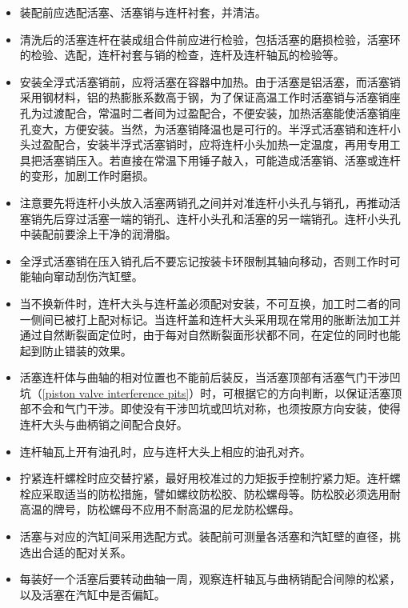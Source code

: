 \documentclass[UTF8]{ctexart}
\numberwithin{figure}{section}
\numberwithin{table}{section}
\begin{document}
\begin{itemize}
	\item 装配前应选配活塞、活塞销与连杆衬套，并清洁。

	\item 清洗后的活塞连杆在装成组合件前应进行检验，包括活塞的磨损检验，活塞环的检验、选配，连杆衬套与销的检查，连杆及连杆轴瓦的检验等。

	\item 安装全浮式活塞销前，应将活塞在容器中加热。由于活塞是铝活塞，而活塞销采用钢材料，铝的热膨胀系数高于钢，为了保证高温工作时活塞销与活塞销座孔为过渡配合，常温时二者间为过盈配合，不便安装，加热活塞能使活塞销座孔变大，方便安装。当然，为活塞销降温也是可行的。半浮式活塞销和连杆小头过盈配合，安装半浮式活塞销时，应将连杆小头加热一定温度，再用专用工具把活塞销压入。若直接在常温下用锤子敲入，可能造成活塞销、活塞或连杆的变形，加剧工作时磨损。

	\item 注意要先将连杆小头放入活塞两销孔之间并对准连杆小头孔与销孔，再推动活塞销先后穿过活塞一端的销孔、连杆小头孔和活塞的另一端销孔。连杆小头孔中装配前要涂上干净的润滑脂。

	\item 全浮式活塞销在压入销孔后不要忘记按装卡环限制其轴向移动，否则工作时可能轴向窜动刮伤汽缸壁。

	\item 当不换新件时，连杆大头与连杆盖必须配对安装，不可互换，加工时二者的同一侧间已被打上配对标记。当连杆盖和连杆大头采用现在常用的胀断法加工并通过自然断裂面定位时，由于每对自然断裂面形状都不同，在定位的同时也能起到防止错装的效果。

	\item 活塞连杆体与曲轴的相对位置也不能前后装反，当活塞顶部有活塞气门干涉凹坑（\cref{piston valve interference pits}）时，可根据它的方向判断，以保证活塞顶部不会和气门干涉。即使没有干涉凹坑或凹坑对称，也须按原方向安装，使得连杆大头与曲柄销之间配合良好。

	\item 连杆轴瓦上开有油孔时，应与连杆大头上相应的油孔对齐。

	\item 拧紧连杆螺栓时应交替拧紧，最好用校准过的力矩扳手控制拧紧力矩。连杆螺栓应采取适当的防松措施，譬如螺纹防松胶、防松螺母等。防松胶必须选用耐高温的牌号，防松螺母不应用不耐高温的尼龙防松螺母。

	\item 活塞与对应的汽缸间采用选配方式。装配前可测量各活塞和汽缸壁的直径，挑选出合适的配对关系。

	\item 每装好一个活塞后要转动曲轴一周，观察连杆轴瓦与曲柄销配合间隙的松紧，以及活塞在汽缸中是否偏缸。
\end{itemize}
\end{document}
